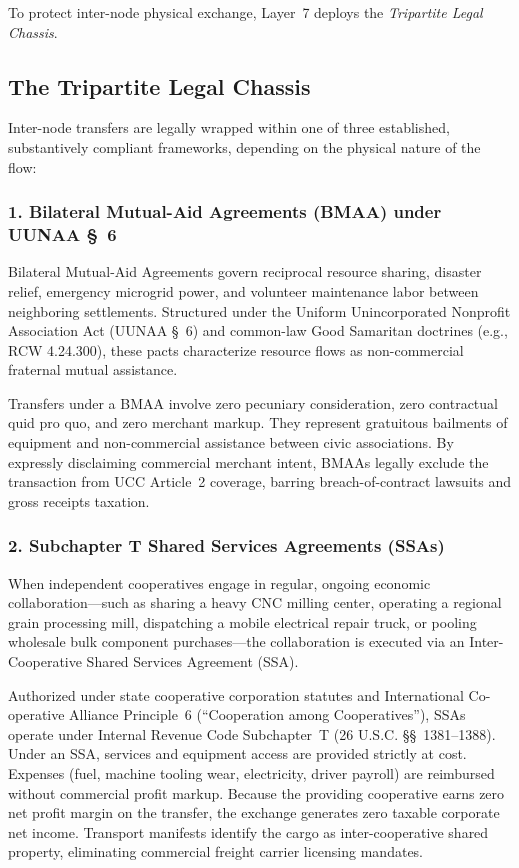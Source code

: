 To protect inter-node physical exchange, Layer~7 deploys the \textit{Tripartite Legal Chassis}.

\subsection{The Tripartite Legal Chassis}

Inter-node transfers are legally wrapped within one of three established, substantively compliant frameworks, depending on the physical nature of the flow:

\subsubsection{1. Bilateral Mutual-Aid Agreements (BMAA) under UUNAA \S~6}
Bilateral Mutual-Aid Agreements govern reciprocal resource sharing, disaster relief, emergency microgrid power, and volunteer maintenance labor between neighboring settlements. Structured under the Uniform Unincorporated Nonprofit Association Act (UUNAA \S~6) and common-law Good Samaritan doctrines (e.g., RCW 4.24.300), these pacts characterize resource flows as non-commercial fraternal mutual assistance. 

Transfers under a BMAA involve zero pecuniary consideration, zero contractual quid pro quo, and zero merchant markup. They represent gratuitous bailments of equipment and non-commercial assistance between civic associations. By expressly disclaiming commercial merchant intent, BMAAs legally exclude the transaction from UCC Article~2 coverage, barring breach-of-contract lawsuits and gross receipts taxation.

\subsubsection{2. Subchapter T Shared Services Agreements (SSAs)}
When independent cooperatives engage in regular, ongoing economic collaboration—such as sharing a heavy CNC milling center, operating a regional grain processing mill, dispatching a mobile electrical repair truck, or pooling wholesale bulk component purchases—the collaboration is executed via an Inter-Cooperative Shared Services Agreement (SSA).

Authorized under state cooperative corporation statutes and International Co-operative Alliance Principle~6 (``Cooperation among Cooperatives''), SSAs operate under Internal Revenue Code Subchapter~T (26 U.S.C. \S\S~1381--1388). Under an SSA, services and equipment access are provided strictly at cost. Expenses (fuel, machine tooling wear, electricity, driver payroll) are reimbursed without commercial profit markup. Because the providing cooperative earns zero net profit margin on the transfer, the exchange generates zero taxable corporate net income. Transport manifests identify the cargo as inter-cooperative shared property, eliminating commercial freight carrier licensing mandates.

